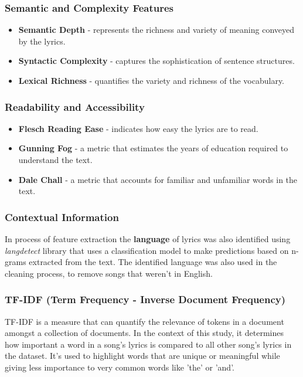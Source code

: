 \subsubsection*{Semantic and Complexity Features}
\begin{itemize}
  \item \textbf{Semantic Depth} - represents the richness and variety of
    meaning conveyed by the lyrics.
  \item \textbf{Syntactic Complexity} - captures the sophistication of
    sentence structures.
  \item \textbf{Lexical Richness} - quantifies the variety and richness of the
    vocabulary.
\end{itemize}



\subsubsection*{Readability and Accessibility}
\begin{itemize}
  \item \textbf{Flesch Reading Ease} - indicates how easy the lyrics are to
    read.
  \item \textbf{Gunning Fog} - a metric that estimates the  years of education
    required to understand the text.
  \item \textbf{Dale Chall} - a metric that accounts for familiar and
    unfamiliar words in the text.
\end{itemize}


\subsubsection*{Contextual Information}
  In process of feature extraction the \textbf{language} of lyrics was also
  identified using \textit{langdetect} library that uses a classification model
  to make predictions based on n-grams extracted from the text. The identified
  language was also used in the cleaning process, to remove songs  that
  weren't in English.

\subsubsection*{TF-IDF (Term Frequency - Inverse Document Frequency)}

TF-IDF\cite{tfidf} is a measure that can quantify the relevance of tokens in a
document amongst a collection of documents. In the context of this study, it
determines how important a word in a song's lyrics is  compared to all other
song's lyrics in the dataset. It's used to highlight words that are unique or
meaningful while giving less importance to very common words like 'the' or
'and'.

